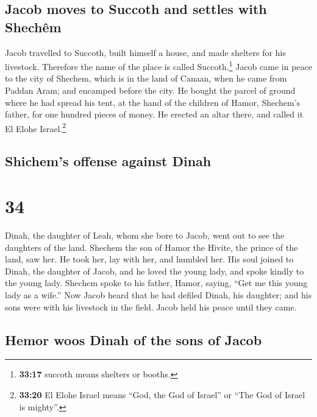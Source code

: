 \hypertarget{jacob-moves-to-succoth-and-settles-with-shechuxeam}{%
\subsection{Jacob moves to Succoth and settles with
Shechêm}\label{jacob-moves-to-succoth-and-settles-with-shechuxeam}}

 Jacob travelled to Succoth, built himself a house, and
made shelters for his livestock. Therefore the name of the place is
called Succoth.\footnote{\textbf{33:17} succoth means shelters or
  booths.}  Jacob came in peace to the city of Shechem,
which is in the land of Canaan, when he came from Paddan Aram; and
encamped before the city.  He bought the parcel of ground
where he had spread his tent, at the hand of the children of Hamor,
Shechem's father, for one hundred pieces of money.  He
erected an altar there, and called it El Elohe Israel.\footnote{\textbf{33:20}
  El Elohe Israel means ``God, the God of Israel'' or ``The God of
  Israel is mighty''.}

\hypertarget{shichems-offense-against-dinah}{%
\subsection{Shichem's offense against
Dinah}\label{shichems-offense-against-dinah}}

\hypertarget{section-33}{%
\section{34}\label{section-33}}

 Dinah, the daughter of Leah, whom she bore to Jacob, went
out to see the daughters of the land.  Shechem the son of
Hamor the Hivite, the prince of the land, saw her. He took her, lay with
her, and humbled her.  His soul joined to Dinah, the
daughter of Jacob, and he loved the young lady, and spoke kindly to the
young lady.  Shechem spoke to his father, Hamor, saying,
``Get me this young lady as a wife.''  Now Jacob heard
that he had defiled Dinah, his daughter; and his sons were with his
livestock in the field. Jacob held his peace until they came.

\hypertarget{hemor-woos-dinah-of-the-sons-of-jacob}{%
\subsection{Hemor woos Dinah of the sons of
Jacob}\label{hemor-woos-dinah-of-the-sons-of-jacob}}

